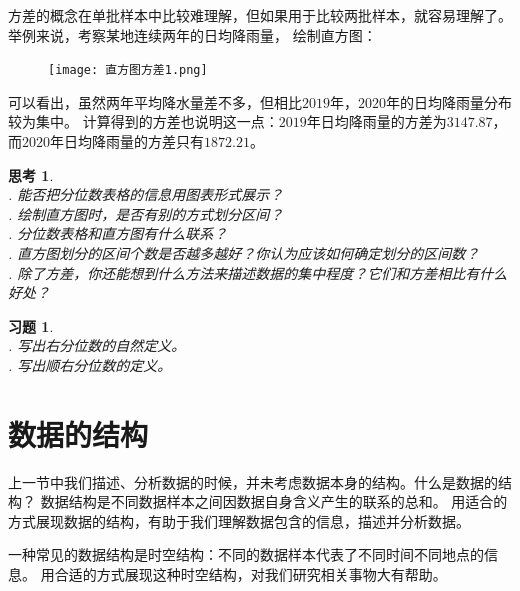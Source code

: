 \documentclass[12pt,UTF8]{ctexbook}
\newtheorem{sk}{思考}[section]
\newtheorem{xt}{习题}[section]
\begin{document}
方差的概念在单批样本中比较难理解，但如果用于比较两批样本，就容易理解了。举例来说，考察某地连续两年的日均降雨量，
绘制直方图：
\begin{figure}[H] %
    \vspace{10pt}
    \centering
    \texttt{[image: 直方图方差1.png]}
\end{figure}
可以看出，虽然两年平均降水量差不多，但相比$2019$年，$2020$年的日均降雨量分布较为集中。
计算得到的方差也说明这一点：$2019$年日均降雨量的方差为$3147.87$，而$2020$年日均降雨量的方差只有$1872.21$。


\begin{sk}
    \mbox{} \\
    . 能否把分位数表格的信息用图表形式展示？\\
    . 绘制直方图时，是否有别的方式划分区间？\\
    . 分位数表格和直方图有什么联系？\\
    . 直方图划分的区间个数是否越多越好？你认为应该如何确定划分的区间数？\\
    . 除了方差，你还能想到什么方法来描述数据的集中程度？它们和方差相比有什么好处？
\end{sk}

\begin{xt}
    \mbox{} \\
    . 写出右分位数的自然定义。\\
    . 写出顺右分位数的定义。
\end{xt}

\section{数据的结构}
上一节中我们描述、分析数据的时候，并未考虑数据本身的结构。什么是数据的结构？
数据结构是不同数据样本之间因数据自身含义产生的联系的总和。
用适合的方式展现数据的结构，有助于我们理解数据包含的信息，描述并分析数据。

一种常见的数据结构是时空结构：不同的数据样本代表了不同时间不同地点的信息。
用合适的方式展现这种时空结构，对我们研究相关事物大有帮助。
\end{document}
